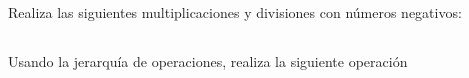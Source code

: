 \documentclass[12pt,addpoints]{evalua}
\begin{document}
\begin{questions}
      \subsection*{\else{}\fi}
      \question[4] Realiza las siguientes multiplicaciones y divisiones con números negativos:
      \begin{multicols}{2}
      \end{multicols}



      \subsection*{\else{}\fi}
      \question[8] Usando la jerarquía de operaciones, realiza la siguiente operación

      \begin{multicols}{2}
\end{multicols}
\end{questions}
\end{document}
